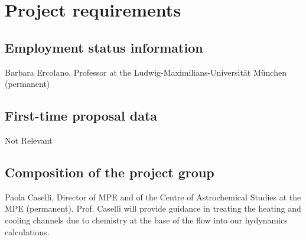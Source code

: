 \documentclass[10pt,fleqn,twoside]{article}
\begin{document}
% 
% 
% 
% 
% 
% 
% 

\section{Project requirements}
\renewcommand{\leftmark}{\sc Project requirements}

\subsection{Employment status information}

Barbara Ercolano, Professor at the Ludwig-Maximilians-Universit\"at
M\"unchen  (permanent)

\subsection{First-time proposal data}

Not Relevant

\subsection{Composition of the project group}

Paola Caselli, Director of MPE and of the Centre of Astrochemical
Studies at the MPE (permanent). Prof. Caselli will provide guidance in
treating the heating and cooling channels due to chemistry at the base
of the flow into our hydynamics calculations. 
\end{document}
